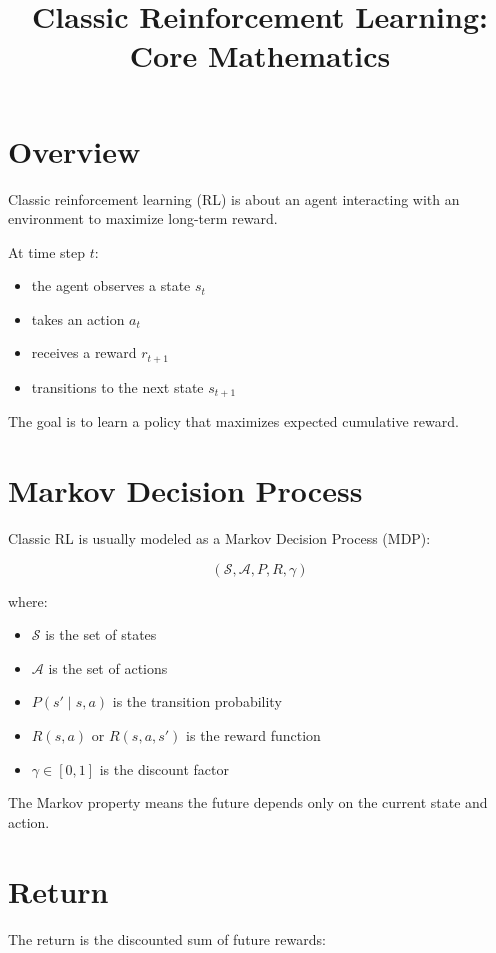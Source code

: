 \documentclass[11pt]{article}
\title{Classic Reinforcement Learning: Core Mathematics}
\author{}
\date{}
\begin{document}
\maketitle

\section*{Overview}

Classic reinforcement learning (RL) is about an agent interacting with an environment to maximize long-term reward.

At time step $t$:
\begin{itemize}
    \item the agent observes a state $s_t$
    \item takes an action $a_t$
    \item receives a reward $r_{t+1}$
    \item transitions to the next state $s_{t+1}$
\end{itemize}

The goal is to learn a policy that maximizes expected cumulative reward.

\section{Markov Decision Process}

Classic RL is usually modeled as a Markov Decision Process (MDP):

\[
(\mathcal{S}, \mathcal{A}, P, R, \gamma)
\]

where:
\begin{itemize}
    \item $\mathcal{S}$ is the set of states
    \item $\mathcal{A}$ is the set of actions
    \item $P(s' \mid s,a)$ is the transition probability
    \item $R(s,a)$ or $R(s,a,s')$ is the reward function
    \item $\gamma \in [0,1]$ is the discount factor
\end{itemize}

The Markov property means the future depends only on the current state and action.

\section{Return}

The return is the discounted sum of future rewards:
\end{document}

